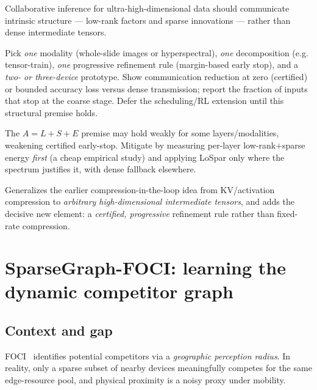 \documentclass[11pt]{article}
\begin{document}
\begin{claimbox}
Collaborative inference for ultra-high-dimensional data should communicate intrinsic
structure --- low-rank factors and sparse innovations --- rather than dense intermediate
tensors.
\end{claimbox}

\begin{expbox}
Pick \emph{one} modality (whole-slide images or hyperspectral), \emph{one} decomposition
(e.g. tensor-train), \emph{one} progressive refinement rule (margin-based early stop), and a
\emph{two- or three-device} prototype. Show communication reduction at zero (certified) or
bounded accuracy loss versus dense transmission; report the fraction of inputs that stop at
the coarse stage. Defer the scheduling/RL extension until this structural premise holds.
\end{expbox}

\begin{riskbox}
The $A=L+S+E$ premise may hold weakly for some layers/modalities, weakening certified
early-stop. Mitigate by measuring per-layer low-rank$+$sparse energy \emph{first} (a cheap
empirical study) and applying LoSpar only where the spectrum justifies it, with dense
fallback elsewhere.
\end{riskbox}

\begin{buildbox}
Generalizes the earlier compression-in-the-loop idea from KV/activation compression to
\emph{arbitrary high-dimensional intermediate tensors}, and adds the decisive new element:
a \emph{certified, progressive} refinement rule rather than fixed-rate compression.
\end{buildbox}

\section{SparseGraph-FOCI: learning the dynamic competitor graph}
\label{sec:sparsegraph}

\subsection*{Context and gap}
FOCI~\cite{foci} identifies potential competitors via a \emph{geographic perception radius}.
In reality, only a sparse subset of nearby devices meaningfully competes for the same
edge-resource pool, and physical proximity is a noisy proxy under mobility.
\end{document}
